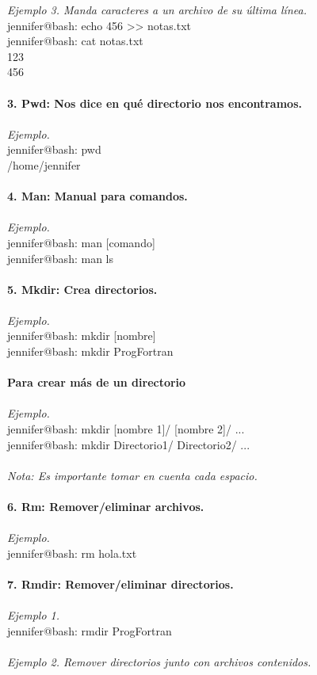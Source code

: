 \documentclass{article}
\begin{document}
\textit{Ejemplo 3. Manda caracteres a un archivo de su última línea.}
\\jennifer@bash: echo 456 >> notas.txt
\\jennifer@bash: cat notas.txt
\\123
\\456
\\\\
\textbf{3. Pwd: Nos dice en qué directorio nos encontramos.}
\\\\\textit{Ejemplo.}
\\jennifer@bash: pwd
\\/home/jennifer
\\ \\
\textbf{4. Man: Manual para comandos.}
\\\\\textit{Ejemplo.}
\\jennifer@bash: man [comando]
\\jennifer@bash: man ls
\\ \\
\textbf{5. Mkdir: Crea directorios.}
\\\\\textit{Ejemplo.}
\\jennifer@bash: mkdir [nombre]
\\jennifer@bash: mkdir ProgFortran
\\ \\
\textbf{Para crear más de un directorio}
\\\\\textit{Ejemplo.}
\\jennifer@bash: mkdir [nombre 1]/ [nombre 2]/ ...
\\jennifer@bash: mkdir Directorio1/ Directorio2/ ...
\\\\\textit{Nota: Es importante tomar en cuenta cada espacio.}
\\ \\
\textbf{6. Rm: Remover/eliminar archivos.}
\\\\\textit{Ejemplo.}
\\jennifer@bash: rm hola.txt
\\ \\
\textbf{7. Rmdir: Remover/eliminar directorios.}
\\\\\textit{Ejemplo 1.}
\\jennifer@bash: rmdir ProgFortran
\\\\\textit{Ejemplo 2. Remover directorios junto con archivos contenidos.}
\end{document}
